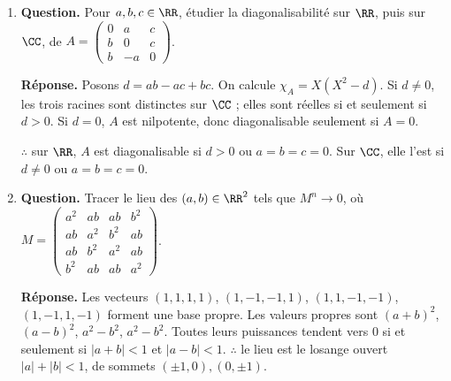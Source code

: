 \documentclass[12pt, a4paper]{article}
\begin{document}
\begin{enumerate}[label=9.\arabic*., start=94]
\begin{minipage}[t]{\linewidth}
\begin{enumerate}[\arabic*.]
\end{enumerate}
\end{minipage}

  \item \begin{minipage}[t]{\linewidth}\raggedright
\textbf{Question.} Pour $a,b,c\in\RR$, étudier la diagonalisabilité sur $\RR$, puis sur $\CC$, de $A=\begin{pmatrix}0&a&c\\b&0&c\\b&-a&0\end{pmatrix}$.
\par\smallskip
\textbf{Réponse.} Posons $d=ab-ac+bc$. On calcule $\chi_A=X(X^2-d)$.
    Si $d\neq0$, les trois racines sont distinctes sur $\CC$ ; elles sont réelles si et seulement si $d>0$.
    Si $d=0$, $A$ est nilpotente, donc diagonalisable seulement si $A=0$.

    $\therefore$ sur $\RR$, $A$ est diagonalisable si $d>0$ ou $a=b=c=0$.
    Sur $\CC$, elle l'est si $d\neq0$ ou $a=b=c=0$.
\end{minipage}

  \item \begin{minipage}[t]{\linewidth}\raggedright
\textbf{Question.} Tracer le lieu des $(a,b)\in\RR^2$ tels que $M^n\to0$, où $\displaystyle M=\begin{pmatrix}a^2&ab&ab&b^2\\ab&a^2&b^2&ab\\ab&b^2&a^2&ab\\b^2&ab&ab&a^2\end{pmatrix}$.
\par\smallskip
\textbf{Réponse.} Les vecteurs $(1,1,1,1)$, $(1,-1,-1,1)$, $(1,1,-1,-1)$, $(1,-1,1,-1)$ forment une base propre.
    Les valeurs propres sont $(a+b)^2$, $(a-b)^2$, $a^2-b^2$, $a^2-b^2$.
    Toutes leurs puissances tendent vers $0$ si et seulement si
    $|a+b|<1$ et $|a-b|<1$.
    $\therefore$ le lieu est le losange ouvert $|a|+|b|<1$, de sommets $(\pm1,0),(0,\pm1)$.
\end{minipage}


\end{enumerate}
\end{document}
